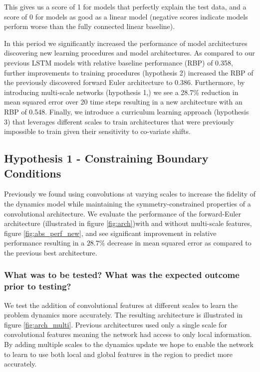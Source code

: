 \documentclass[12pt]{article}
\theoremstyle{plain}
\theoremstyle{remark}
\theoremstyle{definition}
\begin{document}
This gives us a score of 1 for models that perfectly explain the test data, and a score of 0 for models as good as a linear model (negative scores indicate models perform worse than the fully connected linear baseline).

In this period we significantly increased the performance of model architectures discovering new learning procedures and model architectures. As compared to our previous LSTM models with relative baseline performance (RBP) of 0.358, further improvements to training procedures (hypothesis 2) increased the RBP of the previously discovered forward Euler architecture to 0.386. 
Furthermore, by introducing multi-scale networks (hypothesis 1,) we see a 28.7\% reduction in mean squared error over 20 time steps resulting in a new architecture with an RBP of 0.548. Finally, we introduce a curriculum learning approach (hypothesis 3) that leverages different scales to train architectures that were previously impossible to train given their sensitivity to co-variate shifts. 


\subsection{Hypothesis 1 - Constraining Boundary Conditions}

Previously we found using convolutions at varying scales to increase the fidelity of the dynamics model while maintaining the symmetry-constrained properties of a convolutional architecture. We evaluate the performance of the forward-Euler architecture (illustrated in figure \ref{fig:arch})with and without multi-scale features, figure \ref{fig:abs_perf_new}, and see significant improvement in relative performance resulting in a $28.7\%$ decrease in mean squared error as compared to the previous best architecture. 

\subsubsection{What was to be tested? What was the expected outcome prior to testing?}
	We test the addition of convolutional features at different scales to learn the problem dynamics more accurately. The resulting architecture is illustrated in figure \ref{fig:arch_multi}. Previous architectures used only a single scale for convolutional features meaning the network had access to only local information. By adding multiple scales to the dynamics update we hope to enable the network to learn to use both local and global features in the region to predict more accurately.
\end{document}
